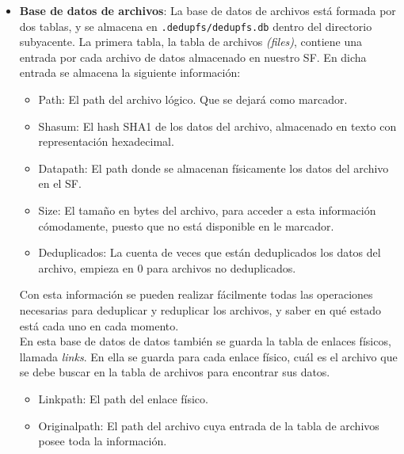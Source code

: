 \documentclass[12pt,a4paper]{article}
\begin{document}
\begin{itemize}
 \item \textbf{Base de datos de archivos}: La base de datos de archivos está formada por dos tablas, y se almacena en \texttt{\small .dedupfs/dedupfs.db} dentro del directorio subyacente. La primera tabla, la tabla de archivos \emph{(files)}, contiene una entrada por cada archivo de datos almacenado en nuestro SF. En dicha entrada se almacena la siguiente información:
  \begin{itemize}
    \item Path: El path del archivo lógico. Que se dejará como marcador.
    \item Shasum: El hash SHA1 de los datos del archivo, almacenado en texto con representación hexadecimal.
    \item Datapath: El path donde se almacenan físicamente los datos del archivo en el SF.
    \item Size: El tamaño en bytes del archivo, para acceder a esta información cómodamente, puesto que no está disponible en le marcador.
    \item Deduplicados: La cuenta de veces que están deduplicados los datos del archivo, empieza en 0 para archivos no deduplicados.
  \end{itemize}
  Con esta información se pueden realizar fácilmente todas las operaciones necesarias para deduplicar y reduplicar los archivos, y saber en qué estado está cada uno en cada momento.\\
  
  En esta base de datos de datos también se guarda la tabla de enlaces físicos, llamada \emph{links}. En ella se guarda para cada enlace físico, cuál es el archivo que se debe buscar en la tabla de archivos para encontrar sus datos.
    \begin{itemize}
    \item Linkpath: El path del enlace físico.
    \item Originalpath: El path del archivo cuya entrada de la tabla de archivos posee toda la información.
  \end{itemize}
  

\end{itemize}
\end{document}
